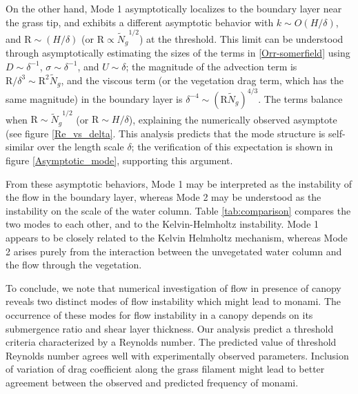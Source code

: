 \documentclass[aps,prl,reprint,twocolumn,showpacs,superscriptaddress,10pt]{revtex4-1}  %
\newcommand{\Rey}{\text{R}}
\newcommand{\Ndg}{\tilde{N}_g}
\begin{document}
On the other hand, Mode 1 asymptotically localizes to the boundary layer near the grass tip, and exhibits a different asymptotic behavior with $k \sim O(H/\delta)$, and $\Rey \sim (H/\delta)$ (or $\Rey \propto {\Ndg}^{1/2}$) at the threshold. 
This limit can be understood through asymptotically estimating the sizes of the terms in \eqref{Orr-somerfield} using $D\sim \delta^{-1}$, $\sigma \sim \delta^{-1}$, and $U\sim \delta$; the magnitude of the advection term is $\Rey/\delta^3 \sim \Rey^2 \Ndg $, and the viscous term (or the vegetation drag term, which has the same magnitude) in the boundary layer is $\delta^{-4} \sim (\Rey \Ndg)^{4/3}$. The terms balance when $\Rey \sim {\Ndg}^{1/2}$ (or $\Rey \sim H/\delta$), explaining the numerically observed asymptote (see figure \ref{Re_vs_delta}. This analysis predicts that the mode structure is self-similar over the length scale $\delta$; the verification of this expectation is shown in figure \ref{Asymptotic_mode}, supporting this argument.

From these asymptotic behaviors, Mode 1 may be interpreted as the instability of the flow in the boundary layer, whereas Mode 2 may be understood as the instability on the scale of the water column. Table \ref{tab:comparison} compares the two modes to each other, and to the Kelvin-Helmholtz instability. Mode 1 appears to be closely related to the Kelvin Helmholtz mechanism, whereas Mode 2 arises purely from the interaction between the unvegetated water column and the flow through the vegetation.

To conclude, we note that numerical investigation of flow in presence of canopy reveals two distinct modes of flow instability which might lead to monami. The occurrence of these modes for flow instability in a 
canopy depends on its submergence ratio and shear layer thickness. Our analysis predict a threshold criteria characterized by a Reynolds number. The predicted value of threshold Reynolds number agrees well with experimentally observed parameters. Inclusion of variation of drag coefficient along the grass filament might lead to better agreement between the observed and predicted frequency of monami. 
\end{document}
